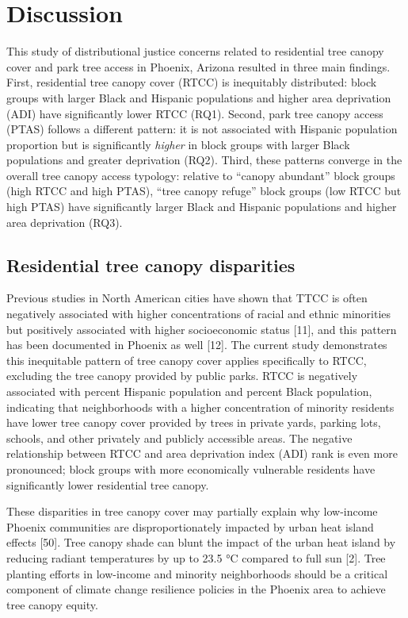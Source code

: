 \documentclass[
  sn-basic,
]{sn-jnl}
\begin{document}
\section{Discussion}\label{sec-discussion}

This study of distributional justice concerns related to residential
tree canopy cover and park tree access in Phoenix, Arizona resulted in
three main findings. First, residential tree canopy cover (RTCC) is
inequitably distributed: block groups with larger Black and Hispanic
populations and higher area deprivation (ADI) have significantly lower
RTCC (RQ1). Second, park tree canopy access (PTAS) follows a different
pattern: it is not associated with Hispanic population proportion but is
significantly \emph{higher} in block groups with larger Black
populations and greater deprivation (RQ2). Third, these patterns
converge in the overall tree canopy access typology: relative to
``canopy abundant'' block groups (high RTCC and high PTAS), ``tree
canopy refuge'' block groups (low RTCC but high PTAS) have significantly
larger Black and Hispanic populations and higher area deprivation (RQ3).

\subsection{Residential tree canopy
disparities}\label{residential-tree-canopy-disparities}

Previous studies in North American cities have shown that TTCC is often
negatively associated with higher concentrations of racial and ethnic
minorities but positively associated with higher socioeconomic status
{[}11{]}, and this pattern has been documented in Phoenix as well
{[}12{]}. The current study demonstrates this inequitable pattern of
tree canopy cover applies specifically to RTCC, excluding the tree
canopy provided by public parks. RTCC is negatively associated with
percent Hispanic population and percent Black population, indicating
that neighborhoods with a higher concentration of minority residents
have lower tree canopy cover provided by trees in private yards, parking
lots, schools, and other privately and publicly accessible areas. The
negative relationship between RTCC and area deprivation index (ADI) rank
is even more pronounced; block groups with more economically vulnerable
residents have significantly lower residential tree canopy.

These disparities in tree canopy cover may partially explain why
low-income Phoenix communities are disproportionately impacted by urban
heat island effects {[}50{]}. Tree canopy shade can blunt the impact of
the urban heat island by reducing radiant temperatures by up to 23.5 °C
compared to full sun {[}2{]}. Tree planting efforts in low-income and
minority neighborhoods should be a critical component of climate change
resilience policies in the Phoenix area to achieve tree canopy equity.
\end{document}
